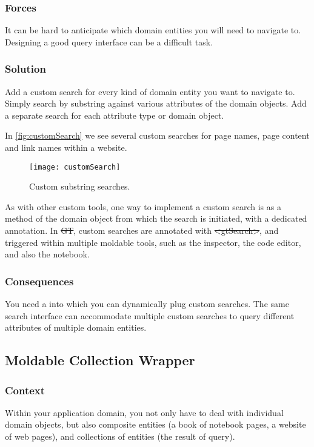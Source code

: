 \documentclass[sigconf]{acmart}
\newcommand{\pattern}[1]{\emph{\nameref{pat:#1}}\xspace}
\newcommand{\GT}{\st{GT}\xspace} %
\begin{document}
\subsubsection*{Forces}
It can be hard to anticipate which domain  entities you will need to navigate to.
Designing a good query interface can be a difficult task.

\subsubsection*{Solution}
Add a custom search for every kind of domain entity you want to navigate to.
Simply search by substring against various attributes of the domain objects.
Add a separate search for each attribute type or domain object.

In \autoref{fig:customSearch} we see several custom searches for page names, page content and link names within a website.

\begin{figure}[h]
  \texttt{[image: customSearch]}
  \caption{Custom substring searches.}
  \label{fig:customSearch}
\end{figure}

As with other custom tools, one way to implement a custom search is as a method of the domain object from which the search is initiated, with a dedicated annotation.
In \GT, custom searches are annotated with \st{<gtSearch>}, and triggered within multiple moldable tools, such as the inspector, the code editor, and also the notebook.

\subsubsection*{Consequences}
You need a \pattern{moldableTool} into which you can dynamically plug custom searches.
The same search interface can accommodate multiple custom searches to query different attributes of multiple domain entities.

\subsection*{Moldable Collection Wrapper}\label{pat:collectionWrapper}

\subsubsection*{Context}
Within your application domain, you not only have to deal with individual domain objects, but also composite entities (\eg a book of notebook pages, a website of web pages), and collections of entities (\eg the result of query).
\end{document}
